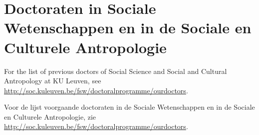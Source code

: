 

\chapter*{Doctoraten in Sociale Wetenschappen en in de Sociale en Culturele Antropologie}
\chaptermark{}



For the list of previous doctors of Social Science and Social and Cultural Antropology at KU Leuven, see \href{http://soc.kuleuven.be/fsw/doctoralprogramme/ourdoctors}{http://soc.kuleuven.be/fsw/doctoralprogramme/ourdoctors}.


\noindent Voor de lijst voorgaande doctoraten in de Sociale Wetenschappen en in de Sociale en Culturele Antropologie, zie \href{http://soc.kuleuven.be/fsw/doctoralprogramme/ourdoctors}{http://soc.kuleuven.be/fsw/doctoralprogramme/ourdoctors}.